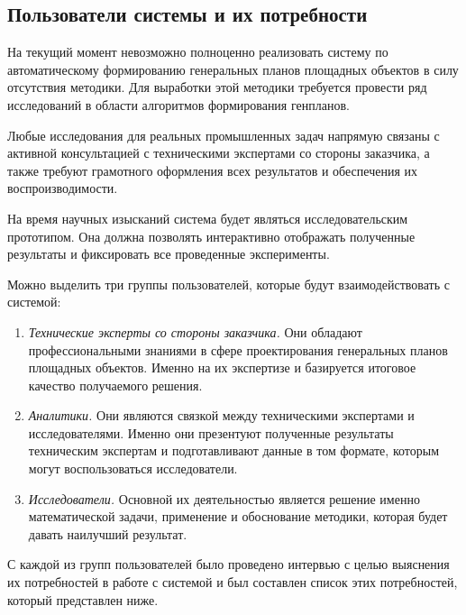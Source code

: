 \subsection{\Large{Пользователи системы и их потребности}}

На текущий момент невозможно полноценно реализовать систему по автоматическому
формированию генеральных планов площадных объектов в силу отсутствия методики.
Для выработки этой методики требуется провести ряд исследований в области
алгоритмов формирования генпланов.

Любые исследования для реальных промышленных задач напрямую связаны с активной консультацией
с техническими экспертами со стороны заказчика,
а также требуют грамотного оформления всех результатов и обеспечения их воспроизводимости.

На время научных изысканий система будет являться исследовательским прототипом.
Она должна позволять интерактивно отображать полученные результаты и фиксировать все проведенные эксперименты.

Можно выделить три группы пользователей, которые будут взаимодействовать с системой:
\begin{enumerate}
    \item {
        \textit{Технические эксперты со стороны заказчика.} Они обладают профессиональными знаниями в сфере
        проектирования генеральных планов площадных объектов. Именно на их экспертизе и базируется итоговое
        качество получаемого решения.
    }
    \item{
        \textit{Аналитики.} Они являются связкой между техническими экспертами и исследователями.
        Именно они презентуют полученные результаты техническим экспертам и подготавливают данные в том формате,
        которым могут воспользоваться исследователи.
    }
    \item{
        \textit{Исследователи.} Основной их деятельностью является решение именно математической задачи,
        применение и обоснование методики, которая будет давать наилучший результат.
    }
\end{enumerate}

С каждой из групп пользователей было проведено интервью с целью выяснения их потребностей в работе с системой
и был составлен список этих потребностей, который представлен ниже.

